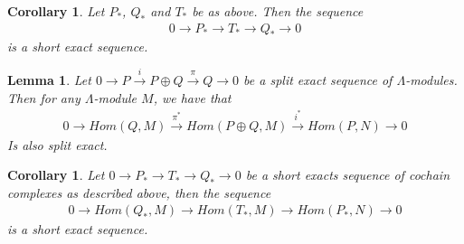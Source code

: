 \documentclass[12pt]{book}
\newtheorem{lemma}[theorem]{Lemma}
\newtheorem{corollary}[theorem]{Corollary}
\theoremstyle{definition}
\begin{document}
\begin{corollary}
    Let $P_*$, $Q_*$ and $T_*$ be as above. Then the sequence 
    \begin{align*}
        0 \rightarrow P_* \rightarrow T_* \rightarrow Q_* \rightarrow 0
    \end{align*}
    is a short exact sequence. 
\end{corollary}

\begin{lemma}
    Let $0 \rightarrow P \xrightarrow{i} P \oplus Q \xrightarrow{\pi} Q \rightarrow 0$ be a split exact sequence of $\Lambda$-modules. Then for any $\Lambda$-module $M$, we have that 
    \begin{align*}
        0 \rightarrow Hom(Q,M) \xrightarrow{\pi^*} Hom(P \oplus Q,M) \xrightarrow{i^*} Hom(P,N) \rightarrow 0
    \end{align*}
    Is also split exact. 
\end{lemma}

\begin{corollary}
    Let $0 \rightarrow P_* \rightarrow T_* \rightarrow Q_* \rightarrow 0$ be a short exacts sequence of cochain complexes as described above, then the sequence
    \begin{align*}
        0 \rightarrow Hom(Q_*,M) \rightarrow Hom(T_*,M) \rightarrow Hom(P_*,N) \rightarrow 0    
    \end{align*}
    is a short exact sequence. 
\end{corollary}
\end{document}
